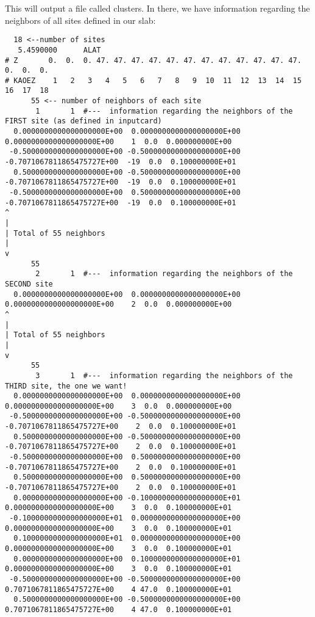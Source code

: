 \documentclass[11pt,fleqn]{book} %
\begin{document}
This will output a file called clusters. In there, we have information
regarding the neighbors of all sites defined in our slab:
\begin{VBox}
{\tiny{
\begin{verbatim}
  18 <--number of sites
   5.4590000      ALAT
# Z       0.  0.  0. 47. 47. 47. 47. 47. 47. 47. 47. 47. 47. 47. 47.  0.  0.  0.
# KAOEZ    1   2   3   4   5   6   7   8   9  10  11  12  13  14  15  16  17  18
      55 <-- number of neighbors of each site
       1       1  #---  information regarding the neighbors of the FIRST site (as defined in inputcard)
  0.0000000000000000000E+00  0.0000000000000000000E+00  0.0000000000000000000E+00    1  0.0  0.000000000E+00
 -0.5000000000000000000E+00 -0.5000000000000000000E+00 -0.7071067811865475727E+00  -19  0.0  0.100000000E+01
  0.5000000000000000000E+00 -0.5000000000000000000E+00 -0.7071067811865475727E+00  -19  0.0  0.100000000E+01
 -0.5000000000000000000E+00  0.5000000000000000000E+00 -0.7071067811865475727E+00  -19  0.0  0.100000000E+01
^
|
| Total of 55 neighbors
|
v
      55
       2       1  #---  information regarding the neighbors of the SECOND site
  0.0000000000000000000E+00  0.0000000000000000000E+00  0.0000000000000000000E+00    2  0.0  0.000000000E+00
^
|
| Total of 55 neighbors
|
v
      55
       3       1  #---  information regarding the neighbors of the THIRD site, the one we want!
  0.0000000000000000000E+00  0.0000000000000000000E+00  0.0000000000000000000E+00    3  0.0  0.000000000E+00
 -0.5000000000000000000E+00 -0.5000000000000000000E+00 -0.7071067811865475727E+00    2  0.0  0.100000000E+01
  0.5000000000000000000E+00 -0.5000000000000000000E+00 -0.7071067811865475727E+00    2  0.0  0.100000000E+01
 -0.5000000000000000000E+00  0.5000000000000000000E+00 -0.7071067811865475727E+00    2  0.0  0.100000000E+01
  0.5000000000000000000E+00  0.5000000000000000000E+00 -0.7071067811865475727E+00    2  0.0  0.100000000E+01
  0.0000000000000000000E+00 -0.1000000000000000000E+01  0.0000000000000000000E+00    3  0.0  0.100000000E+01
 -0.1000000000000000000E+01  0.0000000000000000000E+00  0.0000000000000000000E+00    3  0.0  0.100000000E+01
  0.1000000000000000000E+01  0.0000000000000000000E+00  0.0000000000000000000E+00    3  0.0  0.100000000E+01
  0.0000000000000000000E+00  0.1000000000000000000E+01  0.0000000000000000000E+00    3  0.0  0.100000000E+01
 -0.5000000000000000000E+00 -0.5000000000000000000E+00  0.7071067811865475727E+00    4 47.0  0.100000000E+01
  0.5000000000000000000E+00 -0.5000000000000000000E+00  0.7071067811865475727E+00    4 47.0  0.100000000E+01

\end{verbatim}}}
\end{VBox}
\end{document}
